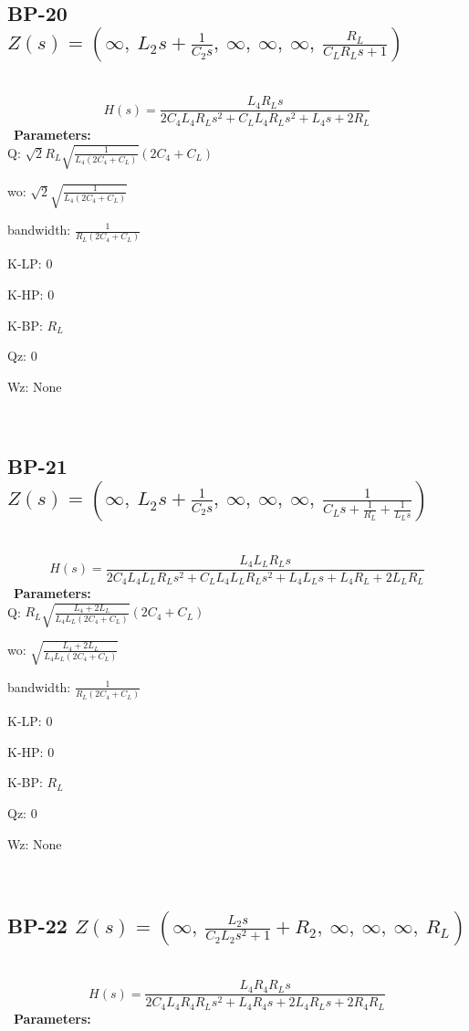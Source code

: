 \documentclass{article}
\begin{document}
\ 

\subsection{BP-20 $Z(s) = \left( \infty, \  L_{2} s + \frac{1}{C_{2} s}, \  \infty, \  \infty, \  \infty, \  \frac{R_{L}}{C_{L} R_{L} s + 1}\right)$ } \ 
\textbf{\[H(s) = \frac{L_{4} R_{L} s}{2 C_{4} L_{4} R_{L} s^{2} + C_{L} L_{4} R_{L} s^{2} + L_{4} s + 2 R_{L}}\] } \ 
\textbf{Parameters:}\\ 

Q: $\sqrt{2} R_{L} \sqrt{\frac{1}{L_{4} \left(2 C_{4} + C_{L}\right)}} \left(2 C_{4} + C_{L}\right)$\ 

wo: $\sqrt{2} \sqrt{\frac{1}{L_{4} \left(2 C_{4} + C_{L}\right)}}$\ 

bandwidth: $\frac{1}{R_{L} \left(2 C_{4} + C_{L}\right)}$\ 

K-LP: $0$\ 

K-HP: $0$\ 

K-BP: $R_{L}$\ 

Qz: $0$\ 

Wz: $\text{None}$\ 

\ 

\subsection{BP-21 $Z(s) = \left( \infty, \  L_{2} s + \frac{1}{C_{2} s}, \  \infty, \  \infty, \  \infty, \  \frac{1}{C_{L} s + \frac{1}{R_{L}} + \frac{1}{L_{L} s}}\right)$ } \ 
\textbf{\[H(s) = \frac{L_{4} L_{L} R_{L} s}{2 C_{4} L_{4} L_{L} R_{L} s^{2} + C_{L} L_{4} L_{L} R_{L} s^{2} + L_{4} L_{L} s + L_{4} R_{L} + 2 L_{L} R_{L}}\] } \ 
\textbf{Parameters:}\\ 

Q: $R_{L} \sqrt{\frac{L_{4} + 2 L_{L}}{L_{4} L_{L} \left(2 C_{4} + C_{L}\right)}} \left(2 C_{4} + C_{L}\right)$\ 

wo: $\sqrt{\frac{L_{4} + 2 L_{L}}{L_{4} L_{L} \left(2 C_{4} + C_{L}\right)}}$\ 

bandwidth: $\frac{1}{R_{L} \left(2 C_{4} + C_{L}\right)}$\ 

K-LP: $0$\ 

K-HP: $0$\ 

K-BP: $R_{L}$\ 

Qz: $0$\ 

Wz: $\text{None}$\ 

\ 

\subsection{BP-22 $Z(s) = \left( \infty, \  \frac{L_{2} s}{C_{2} L_{2} s^{2} + 1} + R_{2}, \  \infty, \  \infty, \  \infty, \  R_{L}\right)$ } \ 
\textbf{\[H(s) = \frac{L_{4} R_{4} R_{L} s}{2 C_{4} L_{4} R_{4} R_{L} s^{2} + L_{4} R_{4} s + 2 L_{4} R_{L} s + 2 R_{4} R_{L}}\] } \ 
\textbf{Parameters:}\\ 
\end{document}
